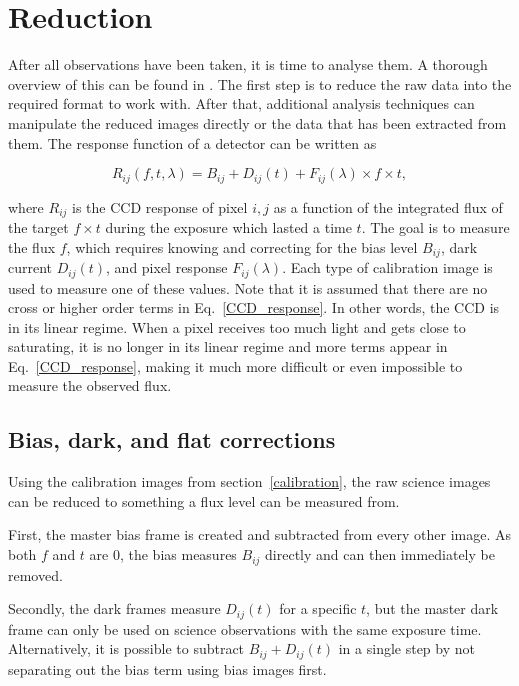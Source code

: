 \documentclass[a4paper,oneside,12pt, class=Latex/Classes/PhDthesisPSnPDF, crop=false]{standalone}
\begin{document}
\section{Reduction}
\label{reduction}
After all observations have been taken, it is time to analyse them. A thorough overview of this can be found in \citet{Image_processing}. The first step is to reduce the raw data into the required format to work with. After that, additional analysis techniques can manipulate the reduced images directly or the data that has been extracted from them. The response function of a detector can be written as

\begin{equation}
	R_{ij}(f, t, \lambda) = B_{ij} + D_{ij}(t) + F_{ij}(\lambda) \times f \times t,
	\label{CCD_response}
\end{equation}

where $R_{ij}$ is the CCD response of pixel $i,j$ as a function of the integrated flux of the target $f \times t$ during the exposure which lasted a time $t$. The goal is to measure the flux $f$, which requires knowing and correcting for the bias level $B_{ij}$, dark current $D_{ij}(t)$, and pixel response $F_{ij}(\lambda)$. Each type of calibration image is used to measure one of these values. Note that it is assumed that there are no cross or higher order terms in Eq.~\ref{CCD_response}. In other words, the CCD is in its linear regime. When a pixel receives too much light and gets close to saturating, it is no longer in its linear regime and more terms appear in Eq.~\ref{CCD_response}, making it much more difficult or even impossible to measure the observed flux.


\subsection{Bias, dark, and flat corrections}
Using the calibration images from section~\ref{calibration}, the raw science images can be reduced to something a flux level can be measured from. 

First, the master bias frame is created and subtracted from every other image. As both $f$ and $t$ are 0, the bias measures $B_{ij}$ directly and can then immediately be removed.

Secondly, the dark frames measure $D_{ij}(t)$ for a specific $t$, but the master dark frame can only be used on science observations with the same exposure time. Alternatively, it is possible to subtract $B_{ij} + D_{ij}(t)$ in a single step by not separating out the bias term using bias images first.
\end{document}

